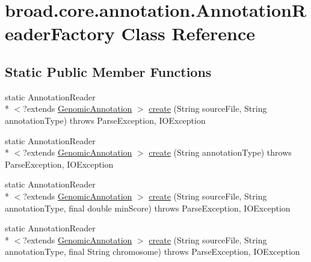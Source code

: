 \hypertarget{classbroad_1_1core_1_1annotation_1_1_annotation_reader_factory}{\section{broad.\+core.\+annotation.\+Annotation\+Reader\+Factory Class Reference}
\label{classbroad_1_1core_1_1annotation_1_1_annotation_reader_factory}
}
\subsection*{Static Public Member Functions}
\begin{DoxyCompactItemize}
\item 
static Annotation\+Reader\\*
$<$?extends \hyperlink{interfacebroad_1_1core_1_1annotation_1_1_genomic_annotation}{Genomic\+Annotation} $>$ \hyperlink{classbroad_1_1core_1_1annotation_1_1_annotation_reader_factory_aefd28e9cf6790bf297b1349a1fb43317}{create} (String source\+File, String annotation\+Type)  throws Parse\+Exception, I\+O\+Exception 
\item 
static Annotation\+Reader\\*
$<$?extends \hyperlink{interfacebroad_1_1core_1_1annotation_1_1_genomic_annotation}{Genomic\+Annotation} $>$ \hyperlink{classbroad_1_1core_1_1annotation_1_1_annotation_reader_factory_ab63fa03f1a13ce432d4c276fe4a76ec9}{create} (String annotation\+Type)  throws Parse\+Exception, I\+O\+Exception 
\item 
static Annotation\+Reader\\*
$<$?extends \hyperlink{interfacebroad_1_1core_1_1annotation_1_1_genomic_annotation}{Genomic\+Annotation} $>$ \hyperlink{classbroad_1_1core_1_1annotation_1_1_annotation_reader_factory_a49d449fbd7c07626966866f744ae72cc}{create} (String source\+File, String annotation\+Type, final double min\+Score)  throws Parse\+Exception, I\+O\+Exception 
\item 
static Annotation\+Reader\\*
$<$?extends \hyperlink{interfacebroad_1_1core_1_1annotation_1_1_genomic_annotation}{Genomic\+Annotation} $>$ \hyperlink{classbroad_1_1core_1_1annotation_1_1_annotation_reader_factory_a4aa8d21072631f53478e96aacf98b86b}{create} (String source\+File, String annotation\+Type, final String chromosome)  throws Parse\+Exception, I\+O\+Exception 
\end{DoxyCompactItemize}


